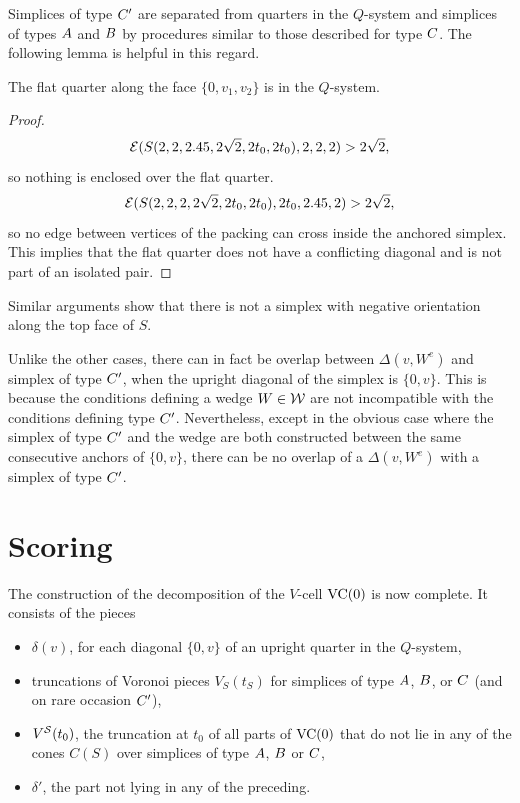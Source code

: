 Simplices of type $C' $ are separated from quarters in the
$Q$-system and simplices of types $A$ and $B$ by procedures
similar to those described for type $C$.  The following lemma is
helpful in this regard.


\begin{lemma}
 The flat quarter along the face $\{0,v_1,v_2\}$ is
in the $Q$-system.
\end{lemma}

\begin{proof}
    $${{\mathcal E}}(S(2,2,2.45,2\sqrt2,2t_0,2t_0),2,2,2)>2\sqrt2,$$
so nothing is enclosed over the flat quarter.
    $${\mathcal E}(S(2,2,2,2\sqrt2,2t_0,2t_0),2t_0,2.45,2)> 2\sqrt2,$$
so no edge between vertices of the packing can cross inside the
anchored simplex. This implies that the flat quarter does not have
a conflicting diagonal and is not part of an isolated pair.
\end{proof}

Similar arguments show that there is not a simplex with negative
orientation along the  top face of $S$.

Unlike the other cases, there can in fact be overlap between
$\Delta(v,W^e)$ and simplex of type $C'$, when the upright
diagonal of the simplex is $\{0,v\}$.  This is because the
conditions defining a wedge $W\in{\mathcal W}$ are not incompatible with
the conditions defining type $C'$.  Nevertheless, except in the
obvious case where the simplex of type $C'$ and the wedge are both
constructed between the same consecutive anchors of $\{0,v\}$, there
can be no overlap of a $\Delta(v,W^e)$ with a simplex of type
$C'$.

\section{Scoring}

The construction of the decomposition of the $V$-cell ${\operatorname{VC}}(0)$
is now complete. It consists of the pieces

    \begin{itemize}
    \item $\delta(v)$, for each diagonal $\{0,v\}$ of an upright quarter
        in the $Q$-system,
    \item truncations of Voronoi pieces $V_S(t_S)$ for simplices of type
        $A$, $B$, or $C$ (and on rare occasion $C'$),
    \item $V^{{\mathcal S}}(t_0)$, the truncation at $t_0$ of all parts of
        ${\operatorname{VC}}(0)$ that do not lie in any of the cones $C(S)$ over
        simplices
        of type $A$, $B$ or $C$,
    \item $\delta'$, the part not lying in any of the preceding.
    \end{itemize}


